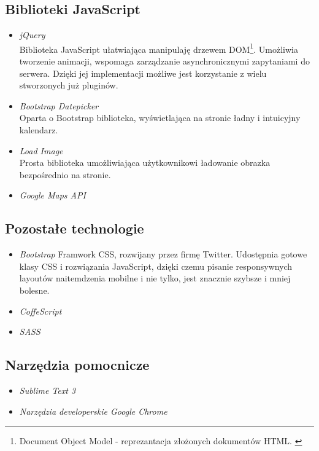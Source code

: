   \subsection{Biblioteki JavaScript}
    \begin{itemize}
      \item \emph{jQuery} \\ Biblioteka JavaScript ułatwiająca manipulaję drzewem DOM\footnote{Document Object Model - reprezantacja złożonych dokumentów HTML. \cite{html5_css3}}. Umożliwia tworzenie animacji, wspomaga zarządzanie asynchronicznymi zapytaniami do serwera. Dzięki jej implementacji możliwe jest korzystanie z wielu stworzonych już pluginów.
      \item \emph{Bootstrap Datepicker} \\ Oparta o Bootstrap biblioteka, wyświetlająca na stronie ładny i intuicyjny kalendarz.
      \item \emph{Load Image} \\ Prosta biblioteka umożliwiająca użytkownikowi ładowanie obrazka bezpośrednio na stronie.
      \item \emph{Google Maps API}
    \end{itemize}
  \subsection{Pozostałe technologie}
    \begin{itemize}
      \item \emph{Bootstrap}
        Framwork CSS, rozwijany przez firmę Twitter. Udostępnia gotowe klasy CSS i rozwiązania JavaScript, dzięki czemu pisanie responsywnych layoutów naitemdzenia mobilne i nie tylko, jest znacznie szybsze i mniej bolesne.
      \item \emph{CoffeScript}
      \item \emph{SASS}
    \end{itemize}
  \subsection{Narzędzia pomocnicze}
    \begin{itemize}
      \item \emph{Sublime Text 3}
      \item \emph{Narzędzia developerskie Google Chrome}
    \end{itemize}
